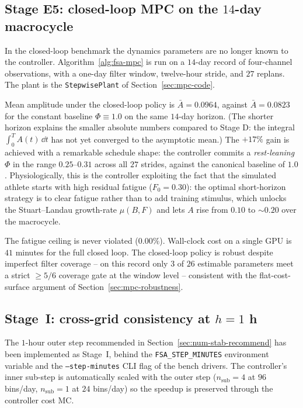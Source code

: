 \subsection{Stage E5: closed-loop MPC on the $14$-day macrocycle}

In the closed-loop benchmark the dynamics parameters are no longer
known to the controller. Algorithm~\ref{alg:fsa-mpc} is run on a
$14$-day record of four-channel observations, with a one-day filter
window, twelve-hour stride, and $27$ replans. The plant is the
\texttt{StepwisePlant} of Section~\ref{sec:mpc-code}.

Mean amplitude under the closed-loop policy is $\bar A = 0.0964$,
against $\bar A = 0.0823$ for the constant baseline
$\Phi \equiv 1.0$ on the same $14$-day horizon. (The shorter horizon
explains the smaller absolute numbers compared to Stage D: the
integral $\int_0^T A(t)\,\dd t$ has not yet converged to the
asymptotic mean.) The $+17\%$ gain is achieved with a remarkable
schedule shape: the controller commits a \emph{rest-leaning} $\Phi$
in the range $0.25$--$0.31$ across all $27$ strides, against the
canonical baseline of $1.0$. Physiologically, this is the controller
exploiting the fact that the simulated athlete starts with high
residual fatigue ($F_0 = 0.30$): the optimal short-horizon strategy
is to clear fatigue rather than to add training stimulus, which
unlocks the Stuart--Landau growth-rate $\mu(B,F)$ and lets $A$ rise
from $0.10$ to $\sim 0.20$ over the macrocycle.

The fatigue ceiling is never violated ($0.00\%$). Wall-clock cost on
a single GPU is $41$ minutes for the full closed loop. The
closed-loop policy is robust despite imperfect filter coverage --
on this record only $3$ of $26$ estimable parameters meet a strict
$\ge 5/6$ coverage gate at the window level -- consistent with the
flat-cost-surface argument of Section~\ref{sec:mpc-robustness}.

\subsection{Stage~I: cross-grid consistency at \texorpdfstring{$h = 1$ h}{h=1h}}\label{sec:results-stage-i}

The $1$-hour outer step recommended in
Section~\ref{sec:num-stab-recommend} has been implemented as
Stage~I, behind the \texttt{FSA\_STEP\_MINUTES} environment
variable and the \texttt{--step-minutes} CLI flag of the bench
drivers. The controller's inner sub-step is automatically scaled
with the outer step ($n_{\mathrm{sub}} = 4$ at $96$ bins/day,
$n_{\mathrm{sub}} = 1$ at $24$ bins/day) so the speedup is
preserved through the controller cost MC.

